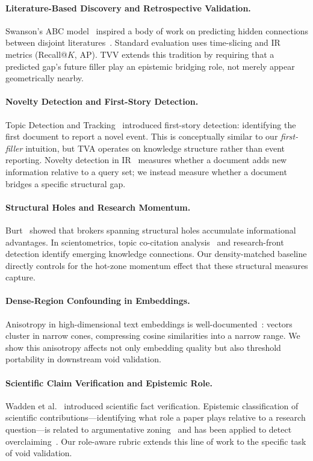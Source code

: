 \documentclass[sigconf]{acmart}
\newcommand{\tvv}{\textsf{TVV}}
\begin{document}
\paragraph{Literature-Based Discovery and Retrospective Validation.}
Swanson's ABC model~\cite{swanson1986fish} inspired a body of work on
predicting hidden connections between disjoint literatures~\cite{gordon1996using,weeber2001using}.
Standard evaluation uses time-slicing and IR metrics (Recall@$K$, AP).
\tvv{} extends this tradition by requiring that a predicted gap's future filler
play an epistemic bridging role, not merely appear geometrically nearby.

\paragraph{Novelty Detection and First-Story Detection.}
Topic Detection and Tracking~\cite{allan1998topic} introduced first-story detection:
identifying the first document to report a novel event.
This is conceptually similar to our \emph{first-filler} intuition, but TVA operates on
knowledge structure rather than event reporting.
Novelty detection in IR~\cite{zhang2002novelty} measures whether a document adds new
information relative to a query set; we instead measure whether a document bridges
a specific structural gap.

\paragraph{Structural Holes and Research Momentum.}
Burt~\cite{burt2004structural} showed that brokers spanning structural holes accumulate
informational advantages.
In scientometrics, topic co-citation analysis~\cite{small1973cocitation} and research-front
detection identify emerging knowledge connections.
Our density-matched baseline directly controls for the hot-zone momentum effect that
these structural measures capture.

\paragraph{Dense-Region Confounding in Embeddings.}
Anisotropy in high-dimensional text embeddings is well-documented~\cite{ethayarajh2019contextual}:
vectors cluster in narrow cones, compressing cosine similarities into a narrow range.
We show this anisotropy affects not only embedding quality but also threshold
portability in downstream void validation.

\paragraph{Scientific Claim Verification and Epistemic Role.}
Wadden et al.~\cite{wadden2020scifact} introduced scientific fact verification.
Epistemic classification of scientific contributions---identifying what role a paper
plays relative to a research question---is related to argumentative zoning~\cite{teufel2002summarizing}
and has been applied to detect overclaiming~\cite{wright2022generating}.
Our role-aware rubric extends this line of work to the specific task of void validation.
\end{document}

